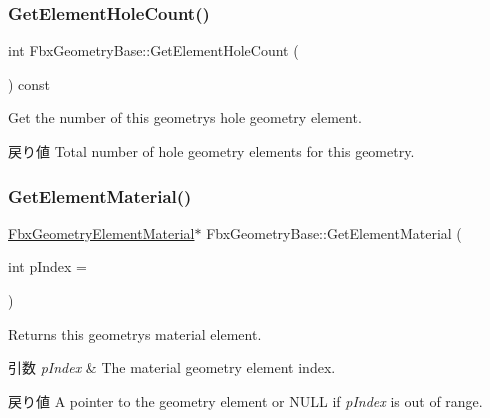 \subsubsection{\texorpdfstring{Get\+Element\+Hole\+Count()}{GetElementHoleCount()}}
{\footnotesize\ttfamily int Fbx\+Geometry\+Base\+::\+Get\+Element\+Hole\+Count (\begin{DoxyParamCaption}{ }\end{DoxyParamCaption}) const}

Get the number of this geometry\textquotesingle{}s hole geometry element. \begin{DoxyReturn}{戻り値}
Total number of hole geometry elements for this geometry. 
\end{DoxyReturn}
\mbox{\label{class_fbx_geometry_base_ac49c730d0f134f1aff416bc4be5ca4e5}} 
\subsubsection{\texorpdfstring{Get\+Element\+Material()}{GetElementMaterial()}\hspace{0.1cm}{\footnotesize\ttfamily [1/2]}}
{\footnotesize\ttfamily \hyperlink{fbxlayer_8h_a1a779f3f614dbf0024c07f4a1d8332f4}{Fbx\+Geometry\+Element\+Material}$\ast$ Fbx\+Geometry\+Base\+::\+Get\+Element\+Material (\begin{DoxyParamCaption}\item[{int}]{p\+Index = {} }\end{DoxyParamCaption})}

Returns this geometry\textquotesingle{}s material element. 
\begin{DoxyParams}{引数}
{\em p\+Index} & The material geometry element index. \\
\hline
\end{DoxyParams}
\begin{DoxyReturn}{戻り値}
A pointer to the geometry element or {\ttfamily N\+U\+LL} if {\itshape p\+Index} is out of range. 
\end{DoxyReturn}
\mbox{\label{class_fbx_geometry_base_acd0f6cd7ecaa99d15aab3e211857f462}} 
